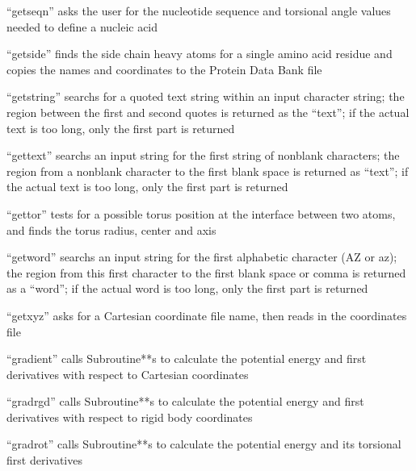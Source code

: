 \documentclass[letterpaper,11pt,english]{sphinxmanual}
\begin{document}
“getseqn” asks the user for the nucleotide sequence and torsional angle values needed to define a nucleic acid


“getside” finds the side chain heavy atoms for a single amino acid residue and copies the names and coordinates to the Protein Data Bank file


“getstring” searchs for a quoted text string within an input character string; the region between the first and second quotes is returned as the “text”; if the actual text is too long, only the first part is returned


“gettext” searchs an input string for the first string of non\sphinxhyphen{}blank characters; the region from a non\sphinxhyphen{}blank character to the first blank space is returned as “text”; if the actual text is too long, only the first part is returned


“gettor” tests for a possible torus position at the interface between two atoms, and finds the torus radius, center and axis


“getword” searchs an input string for the first alphabetic character (A\sphinxhyphen{}Z or a\sphinxhyphen{}z); the region from this first character to the first blank space or comma is returned as a “word”; if the actual word is too long, only the first part is returned


“getxyz” asks for a Cartesian coordinate file name, then reads in the coordinates file


“gradient” calls Subroutine**s to calculate the potential energy and first derivatives with respect to Cartesian coordinates


“gradrgd” calls Subroutine**s to calculate the potential energy and first derivatives with respect to rigid body coordinates


“gradrot” calls Subroutine**s to calculate the potential energy and its torsional first derivatives
\end{document}
